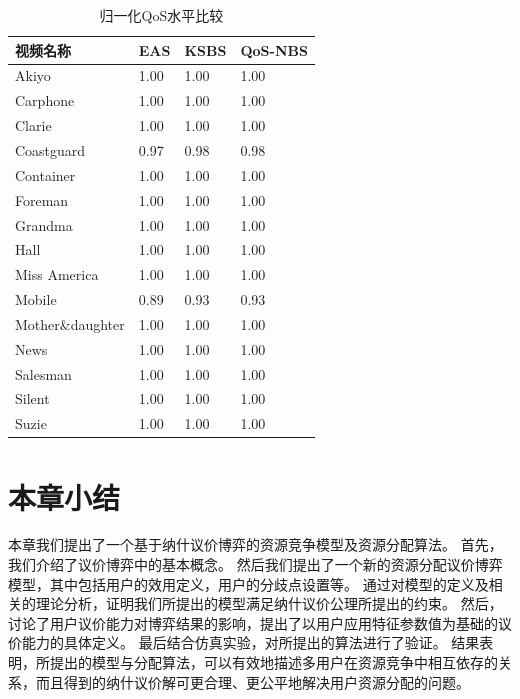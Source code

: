 \begin{table}[htbp]
    \wuhao
    \centering
    \caption{归一化QoS水平比较}
    \begin{tabular*}{\textwidth}{ p{} p{} p{} p{} }
        \toprule
     视频名称&   EAS& KSBS & QoS-NBS \\
     \midrule
Akiyo           	 & 1.00 & 1.00  &1.00\\ 
Carphone        	 & 1.00 & 1.00  &1.00\\ 
Clarie          	 & 1.00 & 1.00  &1.00\\ 
Coastguard      	 & 0.97 & 0.98  &0.98\\ 
Container       	 & 1.00 & 1.00  &1.00\\ 
Foreman         	 & 1.00 & 1.00  &1.00\\ 
Grandma         	 & 1.00 & 1.00  &1.00\\ 
Hall            	 & 1.00 & 1.00  &1.00\\ 
Miss America    	 & 1.00 & 1.00  &1.00\\ 
Mobile          	 & 0.89 & 0.93  &0.93\\ 
Mother\&daughter	 & 1.00 & 1.00  &1.00\\ 
News            	 & 1.00 & 1.00  &1.00\\ 
Salesman        	 & 1.00 & 1.00  &1.00\\ 
Silent          	 & 1.00 & 1.00  &1.00\\ 
Suzie           	 & 1.00 & 1.00  &1.00\\ 
\bottomrule
    \end{tabular*}
    \label{tab:chap_nash:qos_3_schemes}
\end{table}

\section{本章小结}
本章我们提出了一个基于纳什议价博弈的资源竞争模型及资源分配算法。
首先，我们介绍了议价博弈中的基本概念。
然后我们提出了一个新的资源分配议价博弈模型，其中包括用户的效用定义，用户的分歧点设置等。
通过对模型的定义及相关的理论分析，证明我们所提出的模型满足纳什议价公理所提出的约束。
然后，讨论了用户议价能力对博弈结果的影响，提出了以用户应用特征参数值为基础的议价能力的具体定义。
最后结合仿真实验，对所提出的算法进行了验证。
结果表明，所提出的模型与分配算法，可以有效地描述多用户在资源竞争中相互依存的关系，而且得到的纳什议价解可更合理、更公平地解决用户资源分配的问题。


